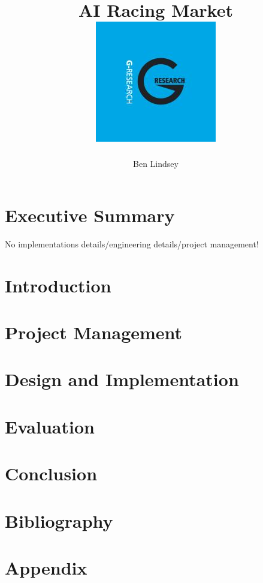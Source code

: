 \documentclass[11pt]{report}
\title{	
  {\huge AI Racing Market}\\[2em]
  {\includegraphics[scale=0.7]{G-Research.jpg}}
}
\author{Ben Lindsey}
\begin{document}
\maketitle

\tableofcontents

\chapter{Executive Summary}
No implementations details/engineering details/project management!

\chapter{Introduction}


\chapter{Project Management}


\chapter{Design and Implementation}


\chapter{Evaluation}


\chapter{Conclusion}


\chapter{Bibliography}


\appendix
\chapter{Appendix}

\end{document}
